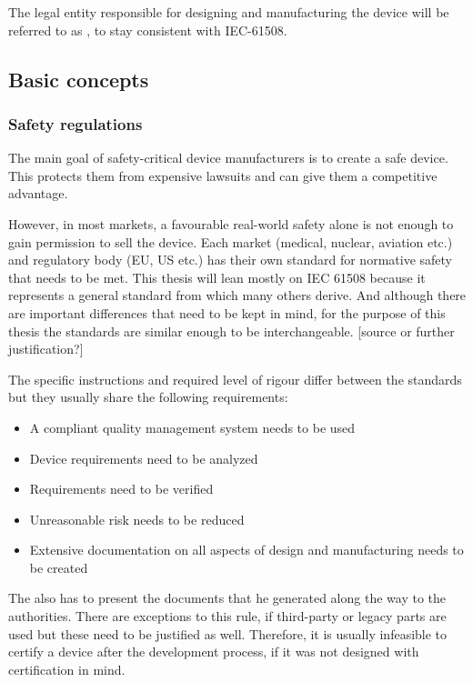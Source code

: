 The legal entity responsible for designing and manufacturing the device will be referred to as \mfg{}, to stay consistent with IEC-61508. 
\subsection{Basic concepts}
\subsubsection{Safety regulations}
The main goal of safety-critical device manufacturers is to create a safe device. This protects them from expensive lawsuits and can give them a competitive advantage.

However, in most markets, a favourable real-world safety alone is not enough to gain permission to sell the device.  Each market (medical, nuclear, aviation etc.) and regulatory body (EU, US etc.) has their own standard for normative safety that needs to be met. This thesis will lean mostly on IEC 61508 \cite{IEC.2010-1}\cite{IEC.2010-2}\cite{IEC.2010-3} because it represents a general standard from which many others derive. And although there are important differences that need to be kept in mind, for the purpose of this thesis the standards are similar enough to be interchangeable. [source or further justification?]

The specific instructions and required level of rigour differ between the standards but they usually share the following requirements:

\begin{itemize}
\item A compliant quality management system needs to be used
\item Device requirements need to be analyzed
\item Requirements need to be verified
\item Unreasonable risk needs to be reduced
\item Extensive documentation on all aspects of design and manufacturing needs to be created
\end{itemize}

The \mfg{} also has to present the documents that he generated along the way to the authorities. There are exceptions to this rule, if third-party or legacy parts are used but these need to be justified as well. Therefore, it is usually infeasible to certify a device after the development process, if it was not designed with certification in mind. 

